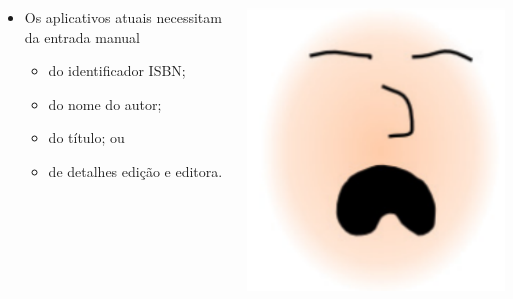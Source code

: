 \documentclass[14pt,beamer]{beamer}
\begin{document}
\begin{frame}
	\vspace{10px}
    \begin{columns}
        \begin{column}{.8\textwidth}
            \begin{itemize}
                \item Os aplicativos atuais necessitam da entrada manual
                    \begin{itemize}
                    \item do identificador ISBN;
                    \item do nome do autor;
                    \item do título; ou 
                    \item de detalhes edição e editora.
                    \end{itemize}
            \end{itemize}
        \end{column}
        \begin{column}{.2\textwidth}
            \includegraphics[scale=.3]{imagens/LixoSono}
        \end{column}
    \end{columns}
\end{frame}
\end{document}
